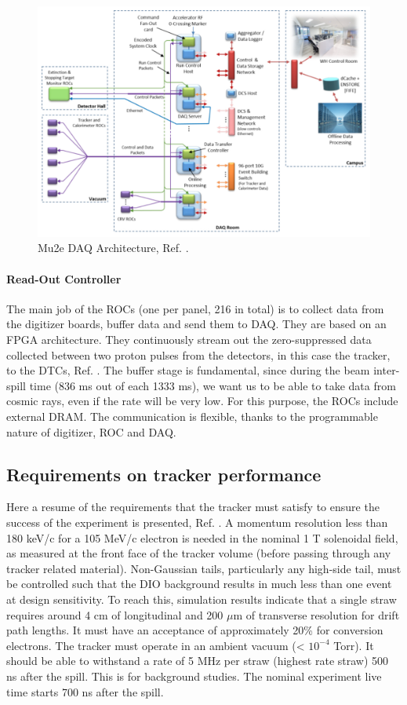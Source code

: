 \begin{figure}[!h]
    \centering
    \includegraphics[width =\textwidth]{figures/png/Screenshot_20240206_144803.png}
    \caption{Mu2e DAQ Architecture, Ref. \cite{GIOIOSA2023167732}.}
    \label{fig:linktodaq}
    \end{figure}
\paragraph{Read-Out Controller}\label{ROC} 
The main job of the ROCs (one per panel, 216 in total) 
is to collect data from the digitizer boards, buffer data and 
send them to DAQ. They are based on an FPGA architecture. They 
continuously stream out the zero-suppressed data collected between 
two proton pulses from the detectors, in this case the tracker, to 
the DTCs, Ref. \cite{GIOIOSA2023167732}. The buffer 
stage is fundamental, since during the beam inter-spill time (836 ms 
out of each 1333 ms), we want us to be able to take data from cosmic 
rays, even if the rate will be very low. For this purpose, the ROCs 
include external DRAM. The communication is flexible, thanks to the 
programmable nature of digitizer, ROC and DAQ. 

\subsection{Requirements on tracker performance}
Here a resume of the requirements that the tracker must satisfy to ensure the success of the experiment is presented, Ref. \cite{trkreq}.
A momentum resolution less than 180 keV/c for a 105 MeV/c electron is needed in the nominal
1 T solenoidal field, as measured at the front face of the tracker volume (before
passing through any tracker related material). Non-Gaussian tails, particularly any
high-side tail, must be controlled such that the DIO background results in much less
than one event at design sensitivity. To reach this, simulation results indicate that 
a single straw requires around 4 cm of longitudinal and 200 $\mu$m of transverse resolution for drift path lengths. 
It must have an acceptance of approximately 20\% for conversion electrons.
The tracker must operate in an ambient vacuum (< $10^{-4}$ Torr).
It should be able to withstand a rate of 5 MHz per straw (highest rate straw) 500 ns after the spill. This is
for background studies. The nominal experiment live time starts 700 ns after the spill.
